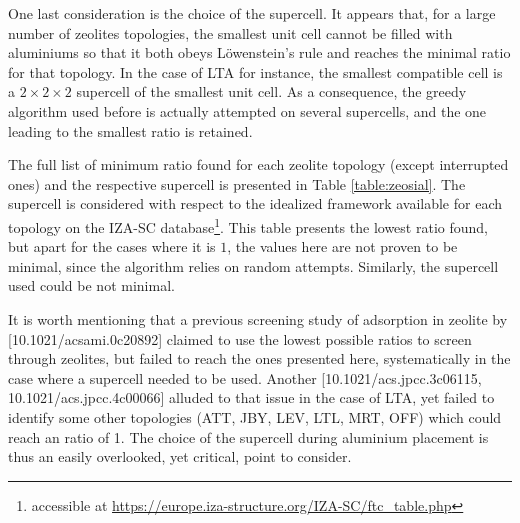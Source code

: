 \documentclass[main.tex]{subfiles}
\begin{document}
One last consideration is the choice of the supercell. It appears that, for a large number of zeolites topologies, the smallest unit cell cannot be filled with aluminiums so that it both obeys L\"owenstein's rule and reaches the minimal \SiAl ratio for that topology. In the case of LTA for instance, the smallest compatible cell is a $2\times2\times2$ supercell of the smallest unit cell. As a consequence, the greedy algorithm used before is actually attempted on several supercells, and the one leading to the smallest \SiAl ratio is retained.

The full list of minimum \SiAl ratio found for each zeolite topology (except interrupted ones) and the respective supercell is presented in Table \ref{table:zeosial}. The supercell is considered with respect to the idealized framework available for each topology on the IZA-SC database\footnote{accessible at \url{https://europe.iza-structure.org/IZA-SC/ftc_table.php}}. This table presents the lowest \SiAl ratio found, but apart for the cases where it is $1$, the values here are not proven to be minimal, since the algorithm relies on random attempts. Similarly, the supercell used could be not minimal.

It is worth mentioning that a previous screening study of adsorption in zeolite by [10.1021/acsami.0c20892] claimed to use the lowest possible \SiAl ratios to screen through zeolites, but failed to reach the ones presented here, systematically in the case where a supercell needed to be used. Another [10.1021/acs.jpcc.3c06115, 10.1021/acs.jpcc.4c00066] alluded to that issue in the case of LTA, yet failed to identify some other topologies (ATT, JBY, LEV, LTL, MRT, OFF) which could reach an \SiAl ratio of 1. The choice of the supercell during aluminium placement is thus an easily overlooked, yet critical, point to consider.
\end{document}
